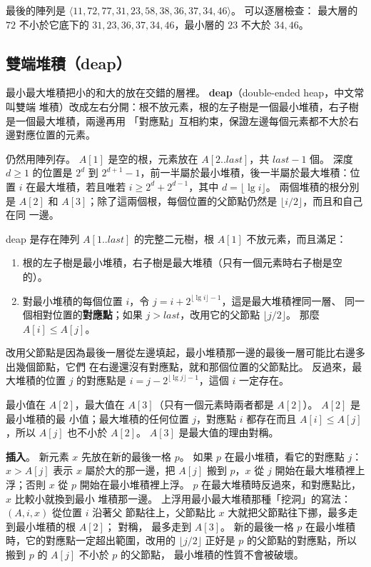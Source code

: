 最後的陣列是 $\langle 11, 72, 77, 31, 23, 58, 38, 36, 37, 34, 46 \rangle$。 可以逐層檢查：
最大層的 $72$ 不小於它底下的 $31, 23, 36, 37, 34, 46$，最小層的 $23$ 不大於 $34, 46$。

\subsection{雙端堆積（deap）}
\label{sec:hp-deap}

最小最大堆積把小的和大的放在交錯的層裡。 \textbf{deap}（double-ended heap，中文常叫雙端
堆積）改成左右分開：根不放元素，根的左子樹是一個最小堆積，右子樹是一個最大堆積，兩邊再用
「對應點」互相約束，保證左邊每個元素都不大於右邊對應位置的元素。

仍然用陣列存。 $A[1]$ 是空的根，元素放在 $A[2..\mathit{last}]$，共 $\mathit{last} - 1$ 個。 深度
$d \ge 1$ 的位置是 $2^d$ 到 $2^{d+1} - 1$，前一半屬於最小堆積，後一半屬於最大堆積：位置 $i$
在最大堆積，若且唯若 $i \ge 2^d + 2^{d-1}$，其中 $d = \lfloor \lg i \rfloor$。 兩個堆積的根分別是
$A[2]$ 和 $A[3]$；除了這兩個根，每個位置的父節點仍然是 $\lfloor i/2 \rfloor$，而且和自己在同
一邊。

\begin{definition}[deap]
\label{def:hp-deap}
deap 是存在陣列 $A[1..\mathit{last}]$ 的完整二元樹，根 $A[1]$ 不放元素，而且滿足：
\begin{enumerate}
\item 根的左子樹是最小堆積，右子樹是最大堆積（只有一個元素時右子樹是空的）。
\item 對最小堆積的每個位置 $i$，令 $j = i + 2^{\lfloor \lg i \rfloor - 1}$，這是最大堆積裡同一層、
同一個相對位置的\textbf{對應點}；如果 $j > \mathit{last}$，改用它的父節點 $\lfloor j/2 \rfloor$。
那麼 $A[i] \le A[j]$。
\end{enumerate}
\end{definition}

改用父節點是因為最後一層從左邊填起，最小堆積那一邊的最後一層可能比右邊多出幾個節點，它們
在右邊還沒有對應點，就和那個位置的父節點比。 反過來，最大堆積的位置 $j$ 的對應點是
$i = j - 2^{\lfloor \lg j \rfloor - 1}$，這個 $i$ 一定存在。

最小值在 $A[2]$，最大值在 $A[3]$（只有一個元素時兩者都是 $A[2]$）。 $A[2]$ 是最小堆積的最
小值；最大堆積的任何位置 $j$，對應點 $i$ 都存在而且 $A[i] \le A[j]$，所以 $A[j]$ 也不小於
$A[2]$。 $A[3]$ 是最大值的理由對稱。

\textbf{插入}。 新元素 $x$ 先放在新的最後一格 $p$。 如果 $p$ 在最小堆積，看它的對應點 $j$：
$x > A[j]$ 表示 $x$ 屬於大的那一邊，把 $A[j]$ 搬到 $p$，$x$ 從 $j$ 開始在最大堆積裡上浮；否則
$x$ 從 $p$ 開始在最小堆積裡上浮。 $p$ 在最大堆積時反過來，和對應點比，$x$ 比較小就換到最小
堆積那一邊。 上浮用最小最大堆積那種「挖洞」的寫法：$(A, i, x)$ 從位置 $i$ 沿著父
節點往上，父節點比 $x$ 大就把父節點往下挪，最多走到最小堆積的根 $A[2]$； 對稱，
最多走到 $A[3]$。 新的最後一格 $p$ 在最小堆積時，它的對應點一定超出範圍，改用的
$\lfloor j/2 \rfloor$ 正好是 $p$ 的父節點的對應點，所以搬到 $p$ 的 $A[j]$ 不小於 $p$ 的父節點，
最小堆積的性質不會被破壞。

